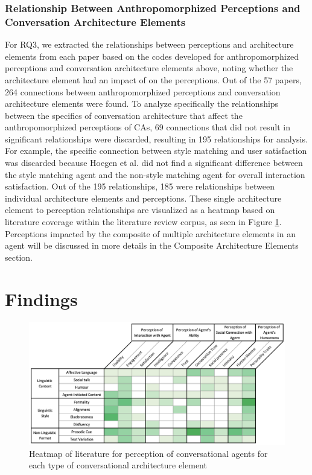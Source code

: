 \documentclass[sigconf,screen,review, anonymous]{acmart}
\newcommand{\cmt}[1]{}%
\begin{document}
\subsubsection*{Relationship Between Anthropomorphized Perceptions and Conversation Architecture Elements}
For RQ3, we extracted the relationships between perceptions and architecture elements from each paper based on the codes developed for anthropomorphized perceptions and conversation architecture elements above, noting whether the architecture element had an impact of on the perceptions. Out of the 57 papers, 264 connections between anthropomorphized perceptions and conversation architecture elements were found. To analyze specifically the relationships between the specifics of conversation architecture that affect the anthropomorphized perceptions of CAs, 69 connections that did not result in significant relationships were discarded, resulting in 195 relationships for analysis. For example, the specific connection between style matching and user satisfaction was discarded because Hoegen et al. \cite{hoegen2019end}\cmt{[31]} did not find a significant difference between the style matching agent and the non-style matching agent for overall interaction satisfaction. Out of the 195 relationships, 185 were relationships between individual architecture elements and perceptions. These single architecture element to perception relationships are visualized as a heatmap based on literature coverage within the literature review corpus, as seen in Figure \ref{fig:heatmap-impact}. Perceptions impacted by the composite of multiple architecture elements in an agent will be discussed in more details in the Composite Architecture Elements section.

\section{Findings}

\begin{figure}[]
  \centering
  \includegraphics[width=\textwidth]{fig-heatmap-impact.png}
  \caption{Heatmap of literature for perception of conversational agents for each type of conversational architecture element}
  \label{fig:heatmap-impact}
\end{figure}
\end{document}
